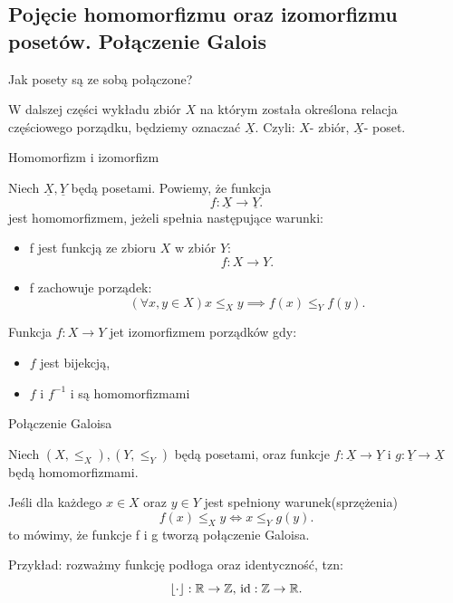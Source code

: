 \subsection{Pojęcie homomorfizmu oraz izomorfizmu posetów. Połączenie Galois}

Jak posety są ze sobą połączone?

\begin{remark}
	W dalszej części wykładu zbiór $X$ na którym została określona relacja częściowego porządku, będziemy oznaczać $\underline{X}$. Czyli:
	$X$- zbiór,  $\underline{X}$- poset.
\end{remark}

\begin{definition}{Homomorfizm i izomorfizm}
	
	Niech $\underline{X}, \underline{Y}$ będą posetami. Powiemy, że
	funkcja
	\[
	f: \underline{X} \rightarrow \underline{Y} 
	.\] 
	jest homomorfizmem, jeżeli spełnia następujące warunki:
	\begin{itemize}
		\item f jest funkcją ze zbioru $X$ w zbiór $Y$:
			 \[
			f: X \rightarrow Y
			.\] 
		\item f zachowuje porządek:
			\[
				\left( \forall x,y \in X \right) x\le_{X} y\implies f(x) \le_{Y} f(y)  
			.\] 
	\end{itemize}

	Funkcja $f: X \rightarrow Y$ jet izomorfizmem porządków gdy:
	\begin{itemize}
		\item $f$ jest bijekcją,
		\item $f$ i $f^{-1}$ i są homomorfizmami
	\end{itemize}
\end{definition}


\begin{definition}{Połączenie Galoisa}

	Niech $(X, \le _{X}), (Y, \le _{Y}) $ będą posetami, oraz funkcje 
	$f: \underline{X} \rightarrow \underline{Y}\text{ i }
	g: \underline{Y} \rightarrow \underline{X}$ będą homomorfizmami.

	Jeśli dla każdego $x\in X$ oraz $y \in Y$ jest spełniony warunek(sprzężenia)
	\[
		f(x) \le _{X} y \iff x \le_{Y} g(y)
	.\] 
to mówimy, że funkcje f i g tworzą połączenie Galoisa.
\end{definition}

Przykład: rozważmy funkcję podłoga oraz identyczność, tzn:
\[
	\left\lfloor \cdot  \right\rfloor: \mathbb{R} \rightarrow \mathbb{Z} \text{, id}: \mathbb{Z}\rightarrow \mathbb{R}
.\] 

